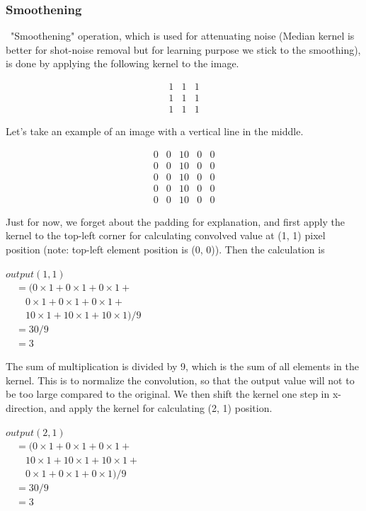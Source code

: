 \subsubsection{Smoothening}
\ "Smoothening" operation, which is
used for attenuating noise (Median kernel is better for shot-noise
removal but for learning purpose we stick to the smoothing), is done by
applying the following kernel to the image. 

\[
 \begin{matrix}
  1 & 1 & 1 \\
  1 & 1 & 1 \\
  1 & 1 & 1
 \end{matrix}
\]

Let's take an example of an image with a vertical line
in the middle.


\[
 \begin{matrix}
  0 & 0 & 10 & 0 & 0 \\
  0 & 0 & 10 & 0 & 0 \\
  0 & 0 & 10 & 0 & 0 \\
  0 & 0 & 10 & 0 & 0 \\
  0 & 0 & 10 & 0 & 0 
 \end{matrix}
\]


Just for now, we forget about the padding for explanation, and first
apply the kernel to the top-left corner for
calculating convolved value at (1, 1) pixel position (note: top-left element position is (0, 0)).
Then the calculation is


$output( 1 , 1 )$\\
$\quad = ( 0 \times 1 + 0 \times 1 + 0 \times 1 + $\\
$\qquad 0 \times 1 + 0 \times 1 + 0 \times 1 + $\\
$\qquad 10 \times 1 + 10 \times 1 + 10 \times 1 ) / 9 $\\
$\quad = 30 / 9 $\\
$\quad = 3$

The sum of multiplication is divided by 9, which is the sum of all
elements in the kernel. This is to normalize the convolution, so that
the output value will not to be too large compared to the original. We
then shift the kernel one step in x-direction, and apply the kernel for
calculating (2, 1) position. 

$output( 2 , 1)$\\
$\quad = ( 0 \times 1 + 0 \times 1 + 0 \times 1 + $\\
$\qquad 10 \times 1 + 10 \times 1+ 10 \times 1 +$\\ 
$\qquad 0 \times 1 + 0 \times 1 + 0 \times 1) / 9 $\\
$\quad = 30 / 9$\\ 
$\quad = 3$

